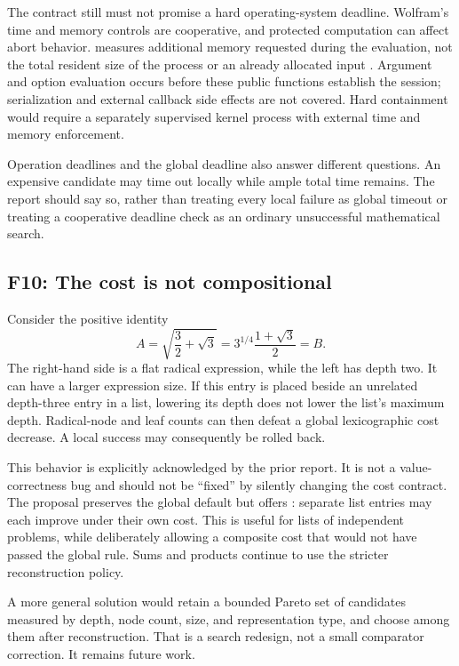 \documentclass[11pt,letterpaper]{article}
\numberwithin{equation}{section}
\theoremstyle{definition}\newtheorem{definition}[theorem]{Definition}
\theoremstyle{remark}\newtheorem{remark}[theorem]{Remark}
\newcommand{\code}[1]{\texttt{\detokenize{#1}}}
\newcommand{\finding}[2]{\subsection{#1: #2}}
\begin{document}
The contract still must not promise a hard operating-system deadline. Wolfram's time and memory controls are cooperative, and protected computation can affect abort behavior. \code{MemoryConstrained} measures additional memory requested during the evaluation, not the total resident size of the process or an already allocated input \cite{wl-time,wl-memory}. Argument and option evaluation occurs before these public functions establish the session; serialization and external callback side effects are not covered. Hard containment would require a separately supervised kernel process with external time and memory enforcement.

Operation deadlines and the global deadline also answer different questions. An expensive candidate may time out locally while ample total time remains. The report should say so, rather than treating every local failure as global timeout or treating a cooperative deadline check as an ordinary unsuccessful mathematical search.

\finding{F10}{The cost is not compositional}
Consider the positive identity
\begin{equation}
A=\sqrt{\frac32+\sqrt3}
=3^{1/4}\frac{1+\sqrt3}{2}=B.
\label{eq:costexample}
\end{equation}
The right-hand side is a flat radical expression, while the left has depth two. It can have a larger expression size. If this entry is placed beside an unrelated depth-three entry in a list, lowering its depth does not lower the list's maximum depth. Radical-node and leaf counts can then defeat a global lexicographic cost decrease. A local success may consequently be rolled back.

This behavior is explicitly acknowledged by the prior report. It is not a value-correctness bug and should not be ``fixed'' by silently changing the cost contract. The proposal preserves the global default but offers \code{"ListProgress" -> "Independent"}: separate list entries may each improve under their own cost. This is useful for lists of independent problems, while deliberately allowing a composite cost that would not have passed the global rule. Sums and products continue to use the stricter reconstruction policy.

A more general solution would retain a bounded Pareto set of candidates measured by depth, node count, size, and representation type, and choose among them after reconstruction. That is a search redesign, not a small comparator correction. It remains future work.
\end{document}
